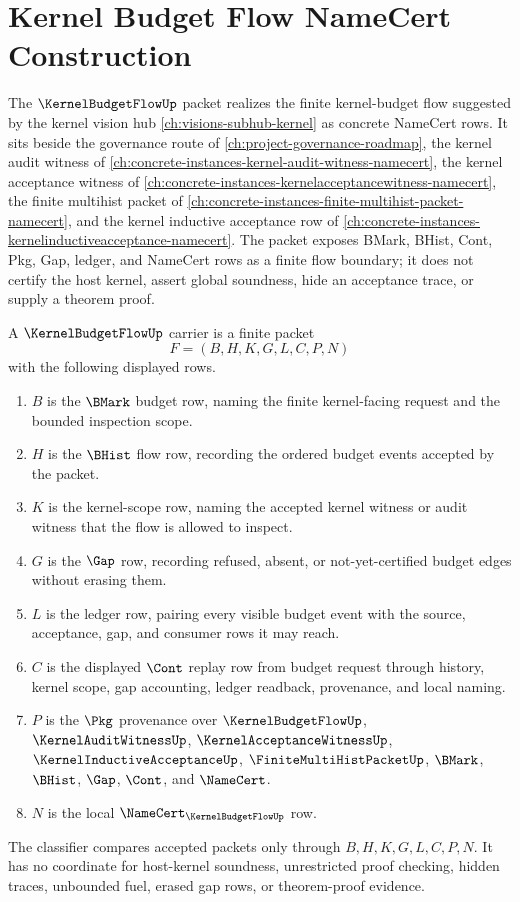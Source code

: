 \chapter{Kernel Budget Flow NameCert Construction}
\label{ch:concrete-instances-kernel-budget-flow-namecert}

The $\KernelBudgetFlowUp$ packet realizes the finite kernel-budget flow suggested by the kernel vision hub \autoref{ch:visions-subhub-kernel} as concrete NameCert rows. It sits beside the governance route of \autoref{ch:project-governance-roadmap}, the kernel audit witness of \autoref{ch:concrete-instances-kernel-audit-witness-namecert}, the kernel acceptance witness of \autoref{ch:concrete-instances-kernelacceptancewitness-namecert}, the finite multihist packet of \autoref{ch:concrete-instances-finite-multihist-packet-namecert}, and the kernel inductive acceptance row of \autoref{ch:concrete-instances-kernelinductiveacceptance-namecert}. The packet exposes BMark, BHist, Cont, Pkg, Gap, ledger, and NameCert rows as a finite flow boundary; it does not certify the host kernel, assert global soundness, hide an acceptance trace, or supply a theorem proof.

\begin{definition}
\label{def:kernel-budget-flow-carrier}
A $\KernelBudgetFlowUp$ carrier is a finite packet
$$
F=(B,H,K,G,L,C,P,N)
$$
with the following displayed rows.
\begin{enumerate}
\item $B$ is the $\BMark$ budget row, naming the finite kernel-facing request and the bounded inspection scope.
\item $H$ is the $\BHist$ flow row, recording the ordered budget events accepted by the packet.
\item $K$ is the kernel-scope row, naming the accepted kernel witness or audit witness that the flow is allowed to inspect.
\item $G$ is the $\Gap$ row, recording refused, absent, or not-yet-certified budget edges without erasing them.
\item $L$ is the ledger row, pairing every visible budget event with the source, acceptance, gap, and consumer rows it may reach.
\item $C$ is the displayed $\Cont$ replay row from budget request through history, kernel scope, gap accounting, ledger readback, provenance, and local naming.
\item $P$ is the $\Pkg$ provenance over $\KernelBudgetFlowUp$, $\KernelAuditWitnessUp$, $\KernelAcceptanceWitnessUp$, $\KernelInductiveAcceptanceUp$, $\FiniteMultiHistPacketUp$, $\BMark$, $\BHist$, $\Gap$, $\Cont$, and $\NameCert$.
\item $N$ is the local $\NameCert_{\KernelBudgetFlowUp}$ row.
\end{enumerate}
The classifier compares accepted packets only through $B,H,K,G,L,C,P,N$. It has no coordinate for host-kernel soundness, unrestricted proof checking, hidden traces, unbounded fuel, erased gap rows, or theorem-proof evidence.
\end{definition}

